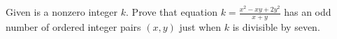 Given is a nonzero integer $k$.
Prove that equation $k =\frac{x^2 - xy + 2y^2}{x + y}$ has an odd number of ordered integer pairs $(x, y)$ just when $k$ is  divisible by seven.